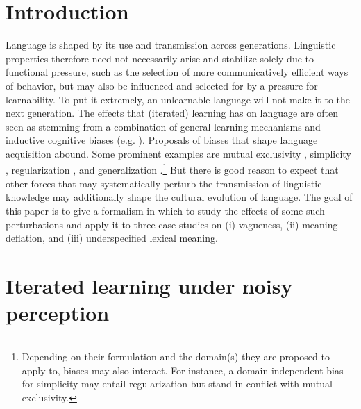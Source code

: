 \documentclass[10pt,a4paper]{article}
\begin{document}
\section{Introduction}
Language is shaped by its use and transmission across generations. Linguistic properties
therefore need not necessarily arise and stabilize solely due to functional pressure, such as
the selection of more communicatively efficient ways of behavior, but may also be influenced
and selected for by a pressure for learnability. To put it extremely, an unlearnable language
will not make it to the next generation. The effects that (iterated) learning has on language
are often seen as stemming from a combination of general learning mechanisms and inductive
cognitive biases
(e.g. \citealt{griffiths+kalish:2007,kirby+etal:2014,tamariz+kirby:2016}). Proposals of biases
that shape language acquisition abound. Some prominent examples are mutual exclusivity
\citep{merriman+bowman:1989,clark:2009}, simplicity \citep{kirby+etal:2015}, regularization
\citep{hudson+etal:2005}, and generalization
\citep{smith:2011,oconnor:2015}.\footnote{Depending on their formulation and the domain(s) they
  are proposed to apply to, biases may also interact. For instance, a domain-independent bias
  for simplicity may entail regularization but stand in conflict with mutual exclusivity.} But
there is good reason to expect that other forces that may systematically perturb the
transmission of linguistic knowledge may additionally shape the cultural evolution of
language. The goal of this paper is to give a formalism in which to study the effects of some
such perturbations and apply it to three case studies on (i) vagueness, (ii) meaning deflation,
and (iii) underspecified lexical meaning. 





\section{Iterated learning under noisy perception}
\end{document}

